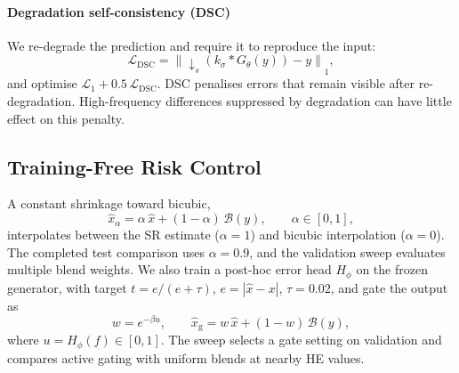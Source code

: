 \documentclass[journal]{IEEEtran}
\begin{document}
\paragraph{Degradation self-consistency (DSC)} We re-degrade the prediction and require it to reproduce the input:
\begin{equation}
\mathcal{L}_{\mathrm{DSC}} = \left\| \downarrow_s\!\left(k_\sigma * G_\theta(y)\right) - y \right\|_1 ,
\label{eq:dsc}
\end{equation}
and optimise $\mathcal{L}_1+0.5\,\mathcal{L}_{\mathrm{DSC}}$. DSC penalises errors that remain visible after re-degradation. High-frequency differences suppressed by degradation can have little effect on this penalty.

\subsection{Training-Free Risk Control}
A constant shrinkage toward bicubic,
\begin{equation}
\hat{x}_\alpha = \alpha\,\hat{x} + (1-\alpha)\,\mathcal{B}(y),\qquad \alpha\in[0,1],
\label{eq:shrink}
\end{equation}
interpolates between the SR estimate ($\alpha=1$) and bicubic interpolation ($\alpha=0$). The completed test comparison uses $\alpha=0.9$, and the validation sweep evaluates multiple blend weights. We also train a post-hoc error head $H_\phi$ on the frozen generator, with target $t=e/(e+\tau)$, $e=|\hat{x}-x|$, $\tau=0.02$, and gate the output as
\begin{equation}
w=e^{-\beta u},\qquad \hat{x}_{\mathrm{g}}=w\,\hat{x}+(1-w)\,\mathcal{B}(y),
\label{eq:gate}
\end{equation}
where $u=H_\phi(f)\in[0,1]$. The sweep selects a gate setting on validation and compares active gating with uniform blends at nearby HE values.
\end{document}
